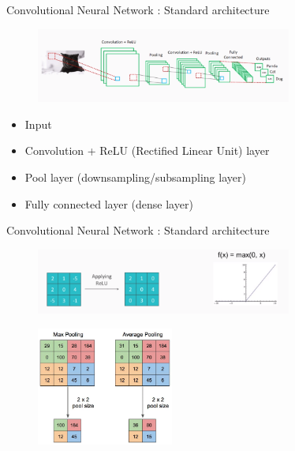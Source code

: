 \documentclass[tikz,table,border=2mm]{beamer}
\begin{document}
\begin{frame}{Convolutional Neural Network : Standard architecture}
\begin{figure}[ht]
    \centering
    \includegraphics[width=0.75\textwidth]{images/architecture_1.png}
\end{figure}
\begin{itemize}
  \item Input
  \item Convolution + ReLU (Rectified Linear Unit) layer
  \item Pool layer (downsampling/subsampling layer)
  \item Fully connected layer (dense layer)
\end{itemize}
\end{frame}
\begin{frame}{Convolutional Neural Network : Standard architecture}
\begin{figure}[ht]
    \centering
    \includegraphics[width=0.75\textwidth]{images/relu.png}
\end{figure}
\begin{figure}[ht]
    \centering
    \includegraphics[width=0.4\textwidth]{images/pooling.png}
\end{figure}
\end{frame}
\end{document}
